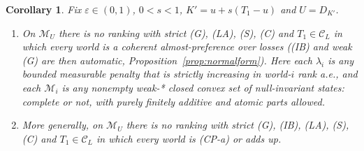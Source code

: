\documentclass[11pt]{article}
\newtheorem{corollary}[theorem]{Corollary}
\theoremstyle{definition}
\theoremstyle{remark}
\newcommand{\M}{\mathcal M}
\newcommand{\C}{\mathcal C}
\begin{document}
\begin{corollary}\label{cor:CPaU}
Fix $\varepsilon\in(0,1)$, $0<s<1$, $K'=u+s(T_1-u)$ and $U=D_{K'}$.
\begin{enumerate}[leftmargin=*,label=(\alph*)]
\item On $\M_U$ there is no ranking with strict (G), (LA), (S), (C) and $T_1\in\C_L$ in which every world is a coherent almost-preference over losses ((IB) and weak (G) are then automatic, Proposition~\ref{prop:normalform}). Here each $\lambda_i$ is any bounded measurable penalty that is strictly increasing in world-$i$ rank a.e., and each $\M_i$ is any nonempty weak-* closed convex set of null-invariant states: complete or not, with purely finitely additive and atomic parts allowed.
\item More generally, on $\M_U$ there is no ranking with strict (G), (IB), (LA), (S), (C) and $T_1\in\C_L$ in which every world is (CP-a) or adds up.
\end{enumerate}
\end{corollary}
\end{document}
